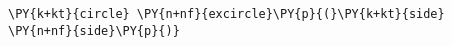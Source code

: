 \begin{Verbatim}[commandchars=\\\{\}]
    \PY{k+kt}{circle} \PY{n+nf}{excircle}\PY{p}{(}\PY{k+kt}{side} \PY{n+nf}{side}\PY{p}{)}
\end{Verbatim}
